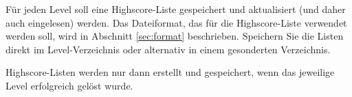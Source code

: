 F\"ur jeden Level soll eine Highscore-Liste gespeichert und aktualisiert
(und daher auch eingelesen) werden. Das Dateiformat, das f\"ur die
Highscore-Liste verwendet werden soll, wird in Abschnitt
\vref{sec:format} beschrieben. Speichern Sie die Listen direkt im
Level-Verzeichnis oder alternativ in einem gesonderten
Verzeichnis. 



Highscore-Listen werden nur dann erstellt und gespeichert, wenn das
jeweilige Level erfolgreich gel\"ost wurde.
